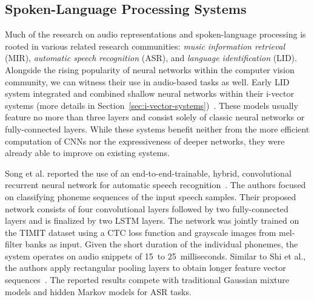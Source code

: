 \subsection{Spoken-Language Processing Systems}
Much of the research on audio representations and spoken-language processing is rooted in various related research communities: \emph{music information retrieval} (MIR), \emph{automatic speech recognition} (ASR), and \emph{language identification} (LID). Alongside the rising popularity of neural networks within the computer vision community, we can witness their use in audio-based tasks as well. Early LID system integrated and combined shallow neural networks within their i-vector systems (more details in Section~\ref{sec:i-vector-systems})~\cite{gonzalez2014automatic, han2013trap, matejka2014neural, richardson2015unified}. These models usually feature no more than three layers and consist solely of classic neural networks or fully-connected layers. While these systems benefit neither from the more efficient computation of CNNs nor the expressiveness of deeper networks, they were already able to improve on existing systems.

Song et al. reported the use of an end-to-end-trainable, hybrid, convolutional recurrent neural network for automatic speech recognition~\cite{song2015end}. The authors focused on classifying phoneme sequences of the input speech samples. Their proposed network consists of four convolutional layers followed by two fully-connected layers and is finalized by two LSTM layers. The network was jointly trained on the TIMIT dataset using a CTC loss function and grayscale images from mel-filter banks as input. Given the short duration of the individual phonemes, the system operates on audio snippets of \num{15}~to \num{25}~milliseconds. Similar to Shi et al., the authors apply rectangular pooling layers to obtain longer feature vector sequences~\cite{shi2016end}. The reported results compete with traditional Gaussian mixture models and hidden Markov models for ASR tasks.

